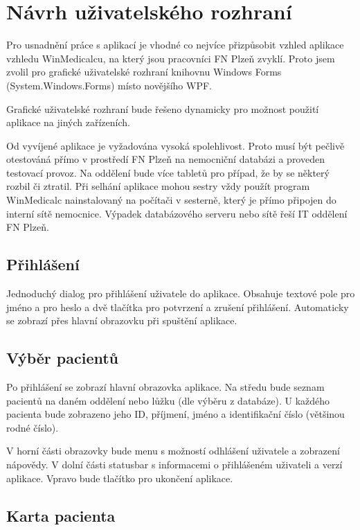 \setlength{\parskip}{1em}

\chapter{Návrh uživatelského rozhraní}

Pro usnadnění práce s aplikací je vhodné co nejvíce přizpůsobit vzhled aplikace vzhledu WinMedicalcu, na který jsou pracovníci FN Plzeň zvyklí. Proto jsem zvolil pro grafické uživatelské rozhraní knihovnu Windows Forms (System.Windows.Forms) místo novějšího WPF.

Grafické uživatelské rozhraní bude řešeno dynamicky pro možnost použití aplikace na jiných zařízeních.

Od vyvíjené aplikace je vyžadována vysoká spolehlivost. Proto musí být pečlivě otestováná přímo v prostředí FN Plzeň na nemocniční databázi a proveden testovací provoz. Na oddělení bude více tabletů pro případ, že by se některý rozbil či ztratil. Při selhání aplikace mohou sestry vždy použít program WinMedicalc nainstalovaný na počítači v sesterně, který je přímo připojen do interní sítě nemocnice. Výpadek databázového serveru nebo sítě řeší IT oddělení FN Plzeň.

\section{Přihlášení}

Jednoduchý dialog pro přihlášení uživatele do aplikace. Obsahuje textové pole pro jméno a pro heslo a dvě tlačítka pro potvrzení a zrušení přihlášení. Automaticky se zobrazí přes hlavní obrazovku při spuštění aplikace.

\section{Výběr pacientů}

Po přihlášení se zobrazí hlavní obrazovka aplikace. Na středu bude seznam pacientů na daném oddělení nebo lůžku (dle výběru z databáze). U každého pacienta bude zobrazeno jeho ID, příjmení, jméno a identifikační číslo (většinou rodné číslo).

V horní části obrazovky bude menu s možností odhlášení uživatele a zobrazení nápovědy. V dolní části statusbar s informacemi o přihlášeném uživateli a verzí aplikace. Vpravo bude tlačítko pro ukončení aplikace.

\section{Karta pacienta}


